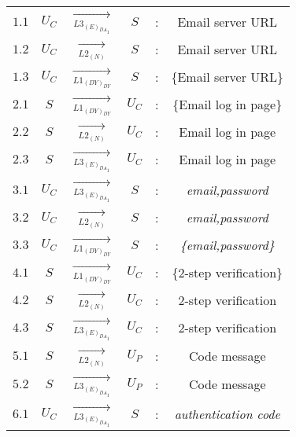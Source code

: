 \begin{center} 
\begin{tabular}{ p{.25cm} c c c c c } 

$1.1$ & $U_C$ & $\xrightarrow[L3_{{(E)}_{{DA}_1}}]{}$ & $S$ & : & Email server URL \\ 

$1.2$ & $U_C$ & $\xrightarrow[L2_{(N)}]{}$ & $S$ & : & Email server URL \\ 

$1.3$ & $U_C$ & $\xrightarrow[L1_{(DY)_{DY}}]{}$ & $S$ & : & \{Email server URL\} \\ 


$2.1$ & $S$ & $\xrightarrow[L1_{(DY)_{DY}}]{}$ & $U_C$ & : & \{Email log in page\} \\ 

$2.2$ & $S$ & $\xrightarrow[L2_{(N)}]{}$ & $U_C$ & : & Email log in page \\ 

$2.3$ & $S$ & $\xrightarrow[L3_{{(E)}_{{DA}_1}}]{}$ & $U_C$ & : & Email log in page \\ 


$3.1$ & $U_C$ & $\xrightarrow[L3_{{(E)}_{{DA}_1}}]{}$ & $S$ & : & \textit{email,password} \\ 

$3.2$ & $U_C$ & $\xrightarrow[L2_{(N)}]{}$ & $S$ & : & \textit{email,password} \\ 

$3.3$ & $U_C$ & $\xrightarrow[L1_{(DY)_{DY}}]{}$ & $S$ & : & \textit{\{email,password\}} \\ 


$4.1$ & $S$ & $\xrightarrow[L1_{(DY)_{DY}}]{}$ & $U_C$ & : & \{2-step verification\} \\ 

$4.2$ & $S$ & $\xrightarrow[L2_{(N)}]{}$ & $U_C$ & : & 2-step verification \\ 

$4.3$ & $S$ & $\xrightarrow[L3_{{(E)}_{{DA}_1}}]{}$ & $U_C$ & : & 2-step verification\\ 


$5.1$ & $S$ & $\xrightarrow[L2_{(N)}]{}$ & $U_P$ & : & Code message \\ 

$5.2$ & $S$ & $\xrightarrow[L3_{{(E)}_{{DA}_1}}]{}$ & $U_P$ & : & Code message \\ 


$6.1$ & $U_C$ & $\xrightarrow[L3_{{(E)}_{{DA}_1}}]{}$ & $S$ & : & \textit{authentication code} \\ 


\end{tabular}
\end{center}
